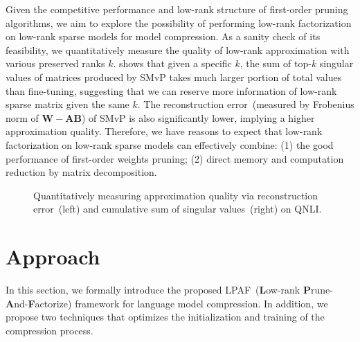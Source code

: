 
Given the competitive performance and low-rank structure of first-order pruning algorithms, 
we aim to explore the possibility of performing low-rank factorization on low-rank sparse models 
for model compression. As a sanity check of its feasibility, we quantitatively measure the 
quality of low-rank approximation with various preserved ranks $k$. 
 shows that given a specific $k$, 
the sum of top-$k$ singular values of matrices produced by SMvP takes much larger portion of total values than fine-tuning, suggesting that we can reserve more information of low-rank sparse matrix given the same $k$. The reconstruction error~(measured by Frobenius norm of $\bm{W}-\bm{A}\bm{B}$) of SMvP is also significantly lower, implying a higher approximation quality. Therefore, we have reasons to expect that low-rank factorization on low-rank sparse models can effectively combine: (1) the good performance of first-order weights pruning; (2) direct memory and computation reduction by matrix decomposition.
\begin{figure}[t]
	\centering
	\caption{Quantitatively measuring approximation quality via reconstruction error~(left) and cumulative sum of singular values~(right) on QNLI.}
	\label{fig:norm}
\end{figure}


\section{Approach}
\label{sec:approach}
In this section, we formally introduce the proposed  
LPAF~(\textbf{L}ow-rank \textbf{P}rune-\textbf{A}nd-\textbf{F}actorize) framework 
for language model compression. In addition, we propose two techniques that optimizes the 
initialization and training of the compression process.

